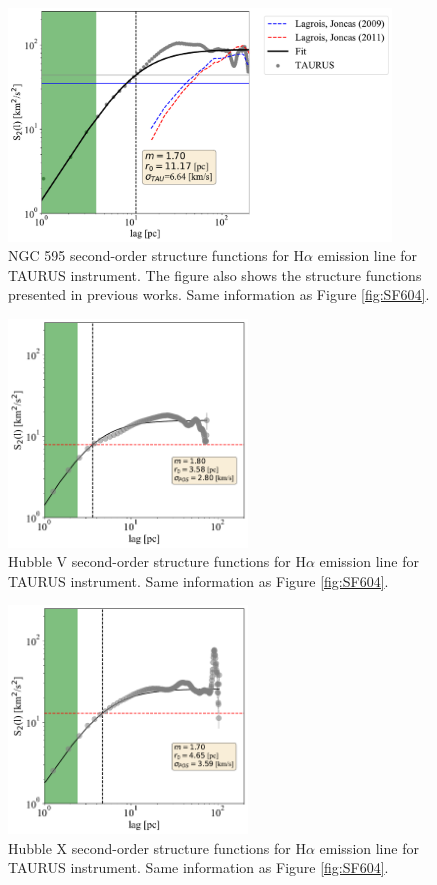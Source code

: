\documentclass[fleqn,usenatbib]{mnras}
\begin{document}
\begin{figure}
\centering 
\includegraphics[width=4in]{Figures/SF595.pdf}
\caption{NGC 595 second-order structure functions for H$\alpha$ emission line for TAURUS instrument. The figure also shows the structure functions presented in previous works. Same information as Figure \ref{fig:SF604}.}
\label{fig:SF595}
\end{figure}

\begin{figure}
\centering 
\includegraphics[width=2.5in]{Figures/SFHV}
\caption{Hubble V second-order structure functions for H$\alpha$ emission line for TAURUS instrument. Same information as Figure \ref{fig:SF604}.}
\label{fig:SFV}
\end{figure}

\begin{figure}
\centering 
\includegraphics[width=2.5in]{Figures/SFHX}
\caption{Hubble X second-order structure functions for H$\alpha$ emission line for TAURUS instrument. Same information as Figure \ref{fig:SF604}.}
\label{fig:SFX}
\end{figure}
\end{document}
